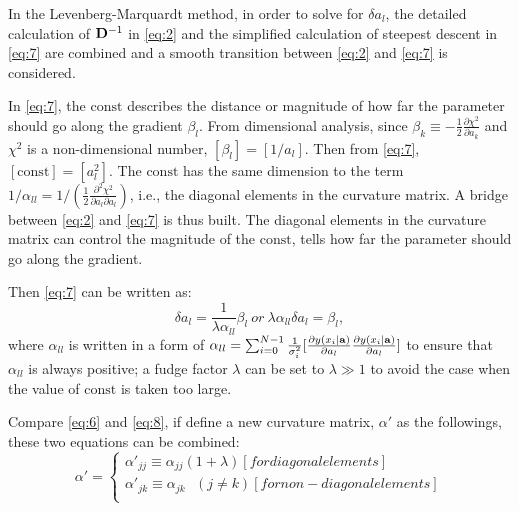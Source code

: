 In the Levenberg-Marquardt method, in order to solve for $\delta a_l$, the detailed calculation of ${\bf D}^{-1}$ in \ref{eq:2} and the simplified calculation of steepest descent in \ref{eq:7} are combined and a smooth transition between \ref{eq:2} and \ref{eq:7} is considered.

In \ref{eq:7}, the $\mathrm{const}$ describes the distance or magnitude of how far the parameter should go along the gradient $\beta_l$. From dimensional analysis, since $\beta_k\equiv-\frac{1}{2}\frac{\partial\chi^2}{\partial a_k}$ and $\chi^2$ is a non-dimensional number, $[\beta_l]=[1/a_l]$. Then from \ref{eq:7}, $[\mathrm{const}]=[a^2_l]$. The $\mathrm{const}$ has the same dimension to the term $1/\alpha_{ll}= 1/(\frac{1}{2}\frac{\partial^2\chi^2}{\partial a_l\partial a_l})$, i.e., the diagonal elements in the curvature matrix. A bridge between \ref{eq:2} and \ref{eq:7} is thus built. The diagonal elements in the curvature matrix can control the magnitude of the $\mathrm{const}$, tells how far the parameter should go along the gradient. 

Then \ref{eq:7} can be written as:
\begin{equation}\label{eq:8}
\delta a_l = \frac{1}{\lambda \alpha_{ll}}\beta_l~or~\lambda \alpha_{ll}\delta a_l = \beta_l, 
\end{equation} 
where $\alpha_{ll}$ is written in a form of $\alpha_{ll}=\sum_{i=0}^{N-1}\frac{1}{\sigma^2_i}[\frac{\partial y(x_i|{\bf a})}{\partial a_l} \frac{\partial y(x_i|{\bf a})}{\partial a_l}]$ to ensure that $\alpha_{ll}$ is always positive; a fudge factor $\lambda$ can be set to $\lambda \gg 1$ to avoid the case when the value of $\mathrm{const}$ is taken too large.

Compare \ref{eq:6} and \ref{eq:8}, if define a new curvature matrix, $\alpha'$ as the followings, these two equations can be combined: 
\begin{equation}\label{eq:9}
\alpha'=\left\{
\begin{aligned}
\alpha'_{jj}\equiv \alpha_{jj}(1+\lambda) [for diagonal elements]\\
\alpha'_{jk}\equiv \alpha_{jk}~~~(j\neq k) [for non-diagonal elements]\\
\end{aligned}
\right.
\end{equation} 


